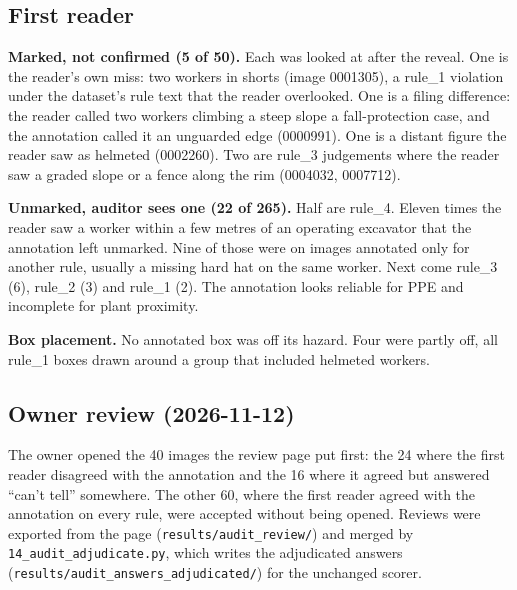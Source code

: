 \subsection{First reader}

\textbf{Marked, not confirmed (5 of 50).} Each was looked at after the reveal. One is the reader's own
miss: two workers in shorts (image 0001305), a rule\_1 violation under the dataset's rule text that the
reader overlooked. One is a filing difference: the reader called two workers climbing a steep slope a
fall-protection case, and the annotation called it an unguarded edge (0000991). One is a distant figure the
reader saw as helmeted (0002260). Two are rule\_3 judgements where the reader saw a graded slope or a fence
along the rim (0004032, 0007712).

\textbf{Unmarked, auditor sees one (22 of 265).} Half are rule\_4. Eleven times the reader saw a worker
within a few metres of an operating excavator that the annotation left unmarked. Nine of those were on
images annotated only for another rule, usually a missing hard hat on the same worker. Next come rule\_3
(6), rule\_2 (3) and rule\_1 (2). The annotation looks reliable for PPE and incomplete for plant
proximity.

\textbf{Box placement.} No annotated box was off its hazard. Four were partly off, all rule\_1 boxes drawn
around a group that included helmeted workers.

\subsection{Owner review (2026-11-12)}

The owner opened the 40 images the review page put first: the 24 where the first reader disagreed with
the annotation and the 16 where it agreed but answered ``can't tell'' somewhere. The other 60, where the
first reader agreed with the annotation on every rule, were accepted without being opened. Reviews were
exported from the page (\texttt{results/audit\_review/}) and merged by \texttt{14\_audit\_adjudicate.py},
which writes the adjudicated answers (\texttt{results/audit\_answers\_adjudicated/}) for the unchanged scorer.

